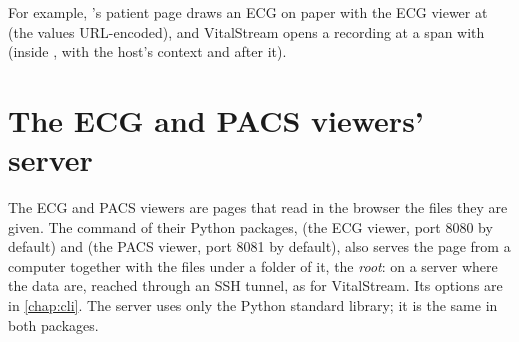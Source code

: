 For example, \md{}'s patient page draws an ECG on paper with the ECG viewer at
(the values URL-encoded), and VitalStream opens a recording at a span with
 (inside \md{}, with the
host's context and  after it).

\section{The ECG and PACS viewers' server}
\label{sec:viewer-api-serve}

The ECG and PACS viewers are pages that read in the browser the files they are given. The
command  of their Python packages,  (the ECG viewer, port 8080 by
default) and  (the PACS viewer, port 8081 by default), also serves the
page from a computer together with the files under a folder of it, the \emph{root}: on a
server where the data are, reached through an SSH tunnel, as for VitalStream. Its options are
in \cref{chap:cli}. The server uses only the Python standard library; it is the same in both
packages.

